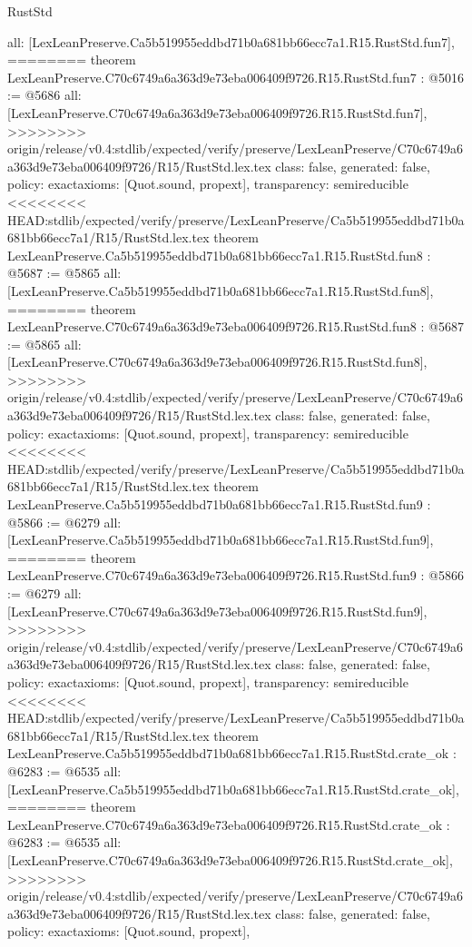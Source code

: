 \begin{lexlean}{RustStd}
\begin{coremodule}
{\begin{coremodule}
{{{{{{{{{{  all: [LexLeanPreserve.Ca5b519955eddbd71b0a681bb66ecc7a1.R15.RustStd.fun7],
========
theorem LexLeanPreserve.C70c6749a6a363d9e73eba006409f9726.R15.RustStd.fun7 : @5016 := @5686 {
  all: [LexLeanPreserve.C70c6749a6a363d9e73eba006409f9726.R15.RustStd.fun7],
>>>>>>>> origin/release/v0.4:stdlib/expected/verify/preserve/LexLeanPreserve/C70c6749a6a363d9e73eba006409f9726/R15/RustStd.lex.tex
  class: false,
  generated: false,
  policy: exact{axioms: [Quot.sound, propext]},
  transparency: semireducible
}
<<<<<<<< HEAD:stdlib/expected/verify/preserve/LexLeanPreserve/Ca5b519955eddbd71b0a681bb66ecc7a1/R15/RustStd.lex.tex
theorem LexLeanPreserve.Ca5b519955eddbd71b0a681bb66ecc7a1.R15.RustStd.fun8 : @5687 := @5865 {
  all: [LexLeanPreserve.Ca5b519955eddbd71b0a681bb66ecc7a1.R15.RustStd.fun8],
========
theorem LexLeanPreserve.C70c6749a6a363d9e73eba006409f9726.R15.RustStd.fun8 : @5687 := @5865 {
  all: [LexLeanPreserve.C70c6749a6a363d9e73eba006409f9726.R15.RustStd.fun8],
>>>>>>>> origin/release/v0.4:stdlib/expected/verify/preserve/LexLeanPreserve/C70c6749a6a363d9e73eba006409f9726/R15/RustStd.lex.tex
  class: false,
  generated: false,
  policy: exact{axioms: [Quot.sound, propext]},
  transparency: semireducible
}
<<<<<<<< HEAD:stdlib/expected/verify/preserve/LexLeanPreserve/Ca5b519955eddbd71b0a681bb66ecc7a1/R15/RustStd.lex.tex
theorem LexLeanPreserve.Ca5b519955eddbd71b0a681bb66ecc7a1.R15.RustStd.fun9 : @5866 := @6279 {
  all: [LexLeanPreserve.Ca5b519955eddbd71b0a681bb66ecc7a1.R15.RustStd.fun9],
========
theorem LexLeanPreserve.C70c6749a6a363d9e73eba006409f9726.R15.RustStd.fun9 : @5866 := @6279 {
  all: [LexLeanPreserve.C70c6749a6a363d9e73eba006409f9726.R15.RustStd.fun9],
>>>>>>>> origin/release/v0.4:stdlib/expected/verify/preserve/LexLeanPreserve/C70c6749a6a363d9e73eba006409f9726/R15/RustStd.lex.tex
  class: false,
  generated: false,
  policy: exact{axioms: [Quot.sound, propext]},
  transparency: semireducible
}
<<<<<<<< HEAD:stdlib/expected/verify/preserve/LexLeanPreserve/Ca5b519955eddbd71b0a681bb66ecc7a1/R15/RustStd.lex.tex
theorem LexLeanPreserve.Ca5b519955eddbd71b0a681bb66ecc7a1.R15.RustStd.crate_ok : @6283 := @6535 {
  all: [LexLeanPreserve.Ca5b519955eddbd71b0a681bb66ecc7a1.R15.RustStd.crate_ok],
========
theorem LexLeanPreserve.C70c6749a6a363d9e73eba006409f9726.R15.RustStd.crate_ok : @6283 := @6535 {
  all: [LexLeanPreserve.C70c6749a6a363d9e73eba006409f9726.R15.RustStd.crate_ok],
>>>>>>>> origin/release/v0.4:stdlib/expected/verify/preserve/LexLeanPreserve/C70c6749a6a363d9e73eba006409f9726/R15/RustStd.lex.tex
  class: false,
  generated: false,
  policy: exact{axioms: [Quot.sound, propext]},
}}}}}}}}}}}}}}
\end{coremodule}}
\end{coremodule}
\end{lexlean}
